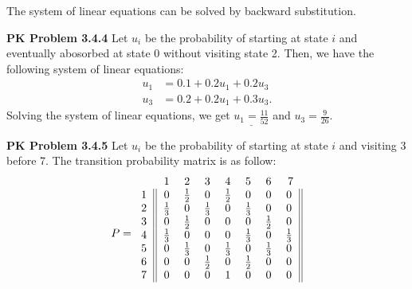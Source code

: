 \documentclass{article}
\begin{document}
The system of linear equations can be solved by backward substitution.
\bigbreak


\textbf{PK Problem 3.4.4}
Let $u_i$ be the probability of starting at state $i$ and eventually abosorbed at state $0$ without visiting state 2.
Then, we have the following system of linear equations:
\begin{align}
    u_1 & = 0.1 + 0.2u_1 + 0.2u_3 \nonumber \\
    u_3 & = 0.2 + 0.2u_1 + 0.3u_3. \nonumber
\end{align}
Solving the system of linear equations, we get $\underline{u_1 = \frac{11}{52}}$ and $u_3 = \frac{9}{26}$.
\bigbreak


\textbf{PK Problem 3.4.5}
Let $u_i$ be the probability of starting at state $i$ and visiting 3 before 7.
The transition probability matrix is as follow:
\begin{align}
    P = 
    \begin{blockarray}{cccccccc}
        & 1 & 2 & 3 & 4 & 5 & 6 & 7 \\
        \begin{block}{c||ccccccc||}
          1 & 0 & \frac{1}{2} & 0 & \frac{1}{2} & 0 & 0 & 0 \\
          2 & \frac{1}{3} & 0 & \frac{1}{3} & 0 & \frac{1}{3} & 0 & 0 \\
          3 & 0 & \frac{1}{2} & 0 & 0 & 0 & \frac{1}{2} & 0 \\
          4 & \frac{1}{3} & 0 & 0 & 0 & \frac{1}{3} & 0 & \frac{1}{3} \\
          5 & 0 & \frac{1}{3} & 0 & \frac{1}{3} & 0 & \frac{1}{3} & 0 \\
          6 & 0 & 0 & \frac{1}{2} & 0 & \frac{1}{2} & 0 & 0 \\
          7 & 0 & 0 & 0 & 1 & 0 & 0 & 0 \\
        \end{block}
    \end{blockarray} \nonumber
\end{align}
\end{document}

